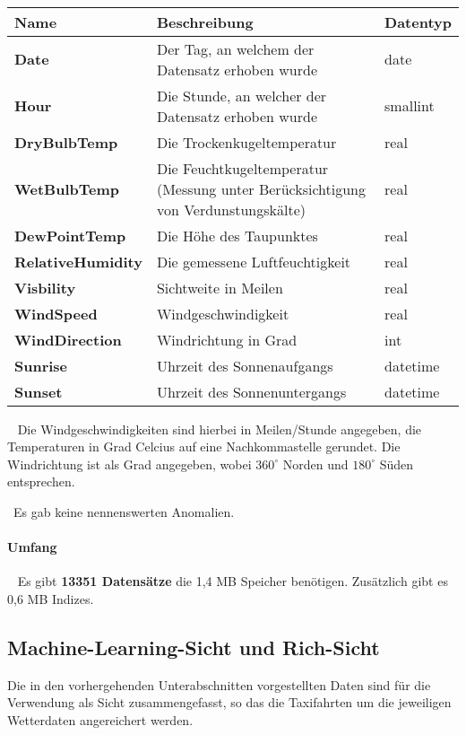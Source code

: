 ~\newline
\begin{center}
	\begin{tabular}{|p{}|p{}|p{}|}
		\hline
		Name & Beschreibung & Datentyp  \\ \hline
		\textbf{Date} & Der Tag, an welchem der Datensatz erhoben wurde & date \\ \hline
		\textbf{Hour} & Die Stunde, an welcher der Datensatz erhoben wurde & smallint \\ \hline
		\textbf{DryBulbTemp} & Die Trockenkugeltemperatur & real \\ \hline
		\textbf{WetBulbTemp} & Die Feuchtkugeltemperatur (Messung unter Berücksichtigung von Verdunstungskälte) & real \\ \hline	
		\textbf{DewPointTemp} & Die Höhe des Taupunktes & real\\ \hline
		\textbf{RelativeHumidity} & Die gemessene Luftfeuchtigkeit & real \\ \hline 
		\textbf{Visbility} & Sichtweite in Meilen & real\\ \hline
		\textbf{WindSpeed} & Windgeschwindigkeit & real\\ \hline
		\textbf{WindDirection} & Windrichtung in Grad & int \\ \hline
		\textbf{Sunrise} & Uhrzeit des Sonnenaufgangs & datetime \\ \hline
		\textbf{Sunset} & Uhrzeit des Sonnenuntergangs & datetime \\ \hline
	\end{tabular}
\end{center}
~\newline
Die Windgeschwindigkeiten sind hierbei in Meilen/Stunde angegeben, die Temperaturen in Grad Celcius auf eine Nachkommastelle gerundet. Die Windrichtung ist als Grad angegeben, wobei $360^\circ$ Norden und $180^\circ $ Süden entsprechen.

~\newline Es gab keine nennenswerten Anomalien. 
\paragraph{Umfang} ~\newline
Es gibt \textbf{13351 Datensätze} die 1,4 MB Speicher benötigen. Zusätzlich gibt es 0,6 MB Indizes.

\subsection{Machine-Learning-Sicht und Rich-Sicht}
Die in den vorhergehenden Unterabschnitten vorgestellten Daten sind für die Verwendung als Sicht zusammengefasst, so das die Taxifahrten um die jeweiligen Wetterdaten angereichert werden. 

